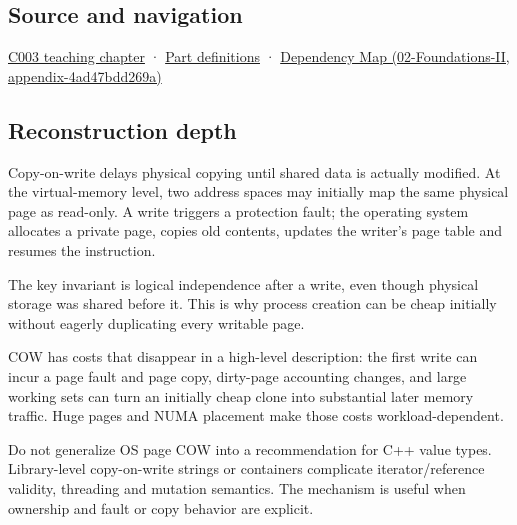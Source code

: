 \subsection{Source and navigation}\label{source-and-navigation}

\href{Continuous\%20Notes/Computing\%20Foundations\%20-\%20From\%20Bits\%20to\%20C++\%20and\%20Systems\%20APIs\#Where\%20the\%20bytes\%20live}{C003 teaching chapter} · \hyperref[appendix-fd090d982a15]{Part definitions} · \href{}{Dependency Map (02-Foundations-II, appendix-4ad47bdd269a)}

\subsection{Reconstruction depth}\label{reconstruction-depth}

Copy-on-write delays physical copying until shared data is actually modified. At the virtual-memory level, two address spaces may initially map the same physical page as read-only. A write triggers a protection fault; the operating system allocates a private page, copies old contents, updates the writer's page table and resumes the instruction.

The key invariant is logical independence after a write, even though physical storage was shared before it. This is why process creation can be cheap initially without eagerly duplicating every writable page.

COW has costs that disappear in a high-level description: the first write can incur a page fault and page copy, dirty-page accounting changes, and large working sets can turn an initially cheap clone into substantial later memory traffic. Huge pages and NUMA placement make those costs workload-dependent.

Do not generalize OS page COW into a recommendation for C++ value types. Library-level copy-on-write strings or containers complicate iterator/reference validity, threading and mutation semantics. The mechanism is useful when ownership and fault or copy behavior are explicit.
